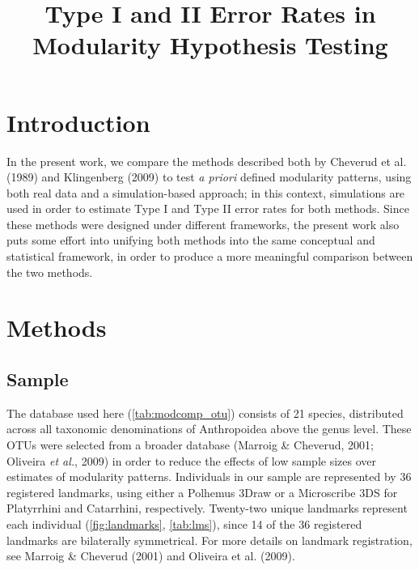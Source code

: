 \documentclass[12pt,]{article}
\title{Type I and II Error Rates in Modularity Hypothesis Testing}
\author{}
\date{}
\begin{document}
\maketitle


\linenumbers
\modulolinenumbers[2]

\onehalfspacing

\section{Introduction}\label{introduction}

In the present work, we compare the methods described both by Cheverud
et al. (1989) and Klingenberg (2009) to test \emph{a priori} defined
modularity patterns, using both real data and a simulation-based
approach; in this context, simulations are used in order to estimate
Type I and Type II error rates for both methods. Since these methods
were designed under different frameworks, the present work also puts
some effort into unifying both methods into the same conceptual and
statistical framework, in order to produce a more meaningful comparison
between the two methods.

\section{Methods}\label{methods}

\subsection{Sample}\label{sample}

The database used here (\autoref{tab:modcomp_otu}) consists of 21
species, distributed across all taxonomic denominations of Anthropoidea
above the genus level. These OTUs were selected from a broader database
(Marroig \& Cheverud, 2001; Oliveira \emph{et al.}, 2009) in order to
reduce the effects of low sample sizes over estimates of modularity
patterns. Individuals in our sample are represented by 36 registered
landmarks, using either a Polhemus 3Draw or a Microscribe 3DS for
Platyrrhini and Catarrhini, respectively. Twenty-two unique landmarks
represent each individual (\autoref{fig:landmarks}, \autoref{tab:lms}),
since 14 of the 36 registered landmarks are bilaterally symmetrical. For
more details on landmark registration, see Marroig \& Cheverud (2001)
and Oliveira et al. (2009).


\end{document}
